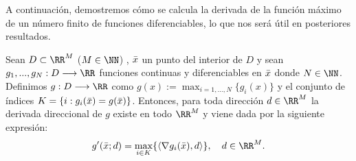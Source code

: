 A continuación, demostremos cómo se calcula la derivada de la función máximo de un número finito de funciones diferenciables, lo que nos será útil en posteriores resultados.
	\begin{proposicionBox}\label{dirDeriv}
		Sean $ D \subset \RR^M$ ($ M \in \NN $) , $ \bar{x} $ un punto del interior de $ D $ y sean $ g_1, ..., g_N : D \longrightarrow \RR $  funciones continuas y diferenciables en $ \bar{x} $ donde $ N \in \NN $. Definimos $ g:D \longrightarrow \RR $ como $ g(x):=\max_{i=1,...,N}\{g_i(x)\} $ y el conjunto de índices $ K = \lbrace  i : g_i(\bar{x}) =  g(\bar{x}) \rbrace $. Entonces, para toda dirección $ d \in \RR^M $ la derivada direccional de $ g $ existe en todo $ \RR^M $ y viene dada por la siguiente expresión:
		\begin{equation}
			g'(\barx;d) = \max_{i \in K}\{ \langle \nabla g_i(\barx), d \rangle\}, \quad d\in\RR^M.
		\end{equation}
	\end{proposicionBox}
